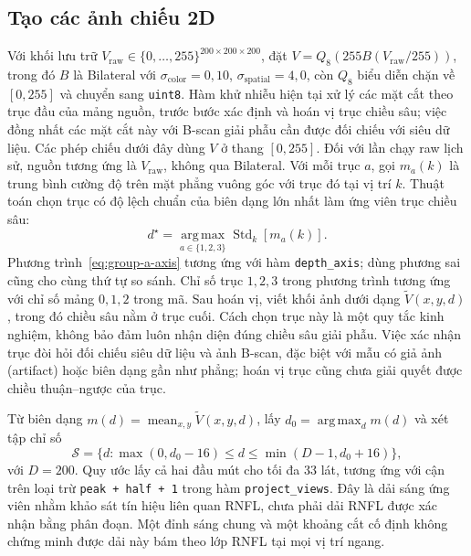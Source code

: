 \documentclass[14pt,a4paper,oneside]{extreport}
\begin{document}
\subsection{Tạo các ảnh chiếu 2D}
Với khối lưu trữ $V_{\mathrm{raw}}\in\{0,\ldots,255\}^{200\times200\times200}$,
đặt $V=Q_8(255B(V_{\mathrm{raw}}/255))$, trong đó $B$ là Bilateral
với $\sigma_{\mathrm{color}}=0{,}10$, $\sigma_{\mathrm{spatial}}=4{,}0$,
còn $Q_8$ biểu diễn chặn về $[0,255]$ và chuyển sang \texttt{uint8}.
Hàm khử nhiễu hiện tại xử lý các mặt cắt theo trục đầu của mảng nguồn,
trước bước xác định và hoán vị trục chiều sâu; việc đồng nhất các mặt
cắt này với B-scan giải phẫu cần được đối chiếu với siêu dữ liệu.
Các phép chiếu dưới đây dùng $V$ ở thang $[0,255]$.
Đối với lần chạy raw lịch sử, nguồn tương ứng là $V_{\mathrm{raw}}$,
không qua Bilateral.
Với mỗi trục $a$, gọi $m_a(k)$ là trung bình cường độ trên mặt phẳng vuông góc
với trục đó tại vị trí $k$. Thuật toán chọn trục có độ lệch chuẩn của
biên dạng lớn nhất làm ứng viên trục chiều sâu:
\begin{equation}
  d^\star=\operatorname*{arg\,max}_{a\in\{1,2,3\}}
           \operatorname{Std}_k\!\left[m_a(k)\right].
  \label{eq:group-a-axis}
\end{equation}
Phương trình~\eqref{eq:group-a-axis} tương ứng với hàm \texttt{depth\_axis};
dùng phương sai cũng cho cùng thứ tự so sánh. Chỉ số trục $1,2,3$
trong phương trình tương ứng với chỉ số mảng $0,1,2$ trong mã.
Sau hoán vị, viết khối ảnh dưới dạng $\widetilde V(x,y,d)$,
trong đó chiều sâu nằm ở trục cuối. Cách chọn trục này là một quy tắc kinh
nghiệm, không bảo đảm luôn nhận diện đúng chiều sâu giải phẫu. Việc xác nhận
trục đòi hỏi đối chiếu siêu dữ liệu và ảnh B-scan, đặc biệt với mẫu có giả ảnh
(artifact) hoặc biên dạng gần như phẳng; hoán vị trục cũng chưa giải quyết
được chiều thuận--ngược của trục.

Từ biên dạng $m(d)=\operatorname{mean}_{x,y}\widetilde V(x,y,d)$, lấy
$d_0=\operatorname*{arg\,max}_d m(d)$ và xét tập chỉ số
\begin{equation}
  \mathcal S=\{d:\max(0,d_0-16)\leq d\leq\min(D-1,d_0+16)\},
  \label{eq:group-a-slab}
\end{equation}
với $D=200$. Quy ước lấy cả hai đầu mút cho tối đa 33 lát, tương ứng
với cận trên loại trừ \texttt{peak + half + 1} trong hàm \texttt{project\_views}.
Đây là dải sáng ứng viên
nhằm khảo sát tín hiệu liên quan RNFL, chưa phải dải RNFL được xác nhận bằng
phân đoạn. Một đỉnh sáng chung và một khoảng cắt cố định không chứng minh
được dải này bám theo lớp RNFL tại mọi vị trí ngang.
\end{document}
